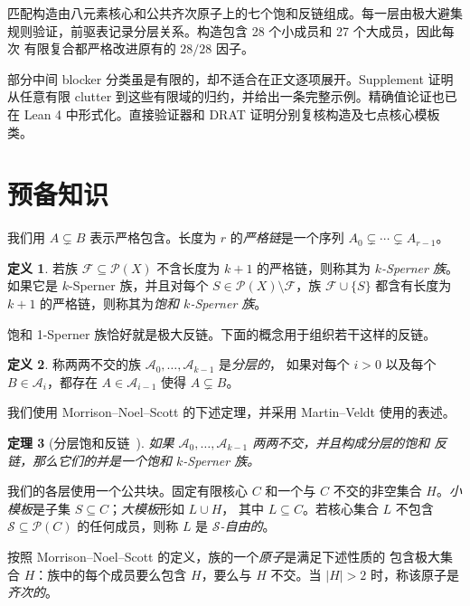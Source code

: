 \documentclass[UTF8,11pt,a4paper,fontset=fandol]{ctexart}
\newtheorem{theorem}{定理}[section]
\theoremstyle{definition}
\newtheorem{definition}[theorem]{定义}
\theoremstyle{remark}
\newcommand{\powerset}{\mathcal{P}}
\newcommand{\family}{\mathcal{F}}
\newcommand{\smallcores}{\mathcal{S}}
\begin{document}
匹配构造由八元素核心和公共齐次原子上的七个饱和反链组成。每一层由极大避集
规则验证，前驱表记录分层关系。构造包含 28 个小成员和 27 个大成员，因此每次
有限复合都严格改进原有的 $28/28$ 因子。

部分中间 blocker 分类虽是有限的，却不适合在正文逐项展开。Supplement 证明
从任意有限 clutter 到这些有限域的归约，并给出一条完整示例。精确值论证也已
在 Lean 4 中形式化。直接验证器和 DRAT 证明分别复核构造及七点核心模板类。

\section{预备知识}
\label{sec:preliminaries}

我们用 $A\subsetneq B$ 表示严格包含。长度为 $r$ 的\emph{严格链}是一个序列
$A_0\subsetneq\cdots\subsetneq A_{r-1}$。

\begin{definition}
若族 $\family\subseteq\powerset(X)$ 不含长度为 $k+1$ 的严格链，则称其为
\emph{$k$-Sperner 族}。如果它是 $k$-Sperner 族，并且对每个
$S\in\powerset(X)\setminus\family$，族 $\family\cup\{S\}$ 都含有长度为
$k+1$ 的严格链，则称其为\emph{饱和 $k$-Sperner 族}。
\end{definition}

饱和 1-Sperner 族恰好就是极大反链。下面的概念用于组织若干这样的反链。

\begin{definition}
称两两不交的族 $\mathcal A_0,\ldots,\mathcal A_{k-1}$ 是\emph{分层的}，
如果对每个 $i>0$ 以及每个 $B\in\mathcal A_i$，都存在
$A\in\mathcal A_{i-1}$ 使得 $A\subsetneq B$。
\end{definition}

我们使用 Morrison--Noel--Scott 的下述定理，并采用 Martin--Veldt 使用的表述。

\begin{theorem}[分层饱和反链~\cite{mns2014,martinveldt2025}]
\label{thm:layered}
如果 $\mathcal A_0,\ldots,\mathcal A_{k-1}$ 两两不交，并且构成分层的饱和
反链，那么它们的并是一个饱和 $k$-Sperner 族。
\end{theorem}

我们的各层使用一个公共块。固定有限核心 $C$ 和一个与 $C$ 不交的非空集合
$H$。\emph{小模板}是子集 $S\subseteq C$；\emph{大模板}形如 $L\cup H$，
其中 $L\subseteq C$。若核心集合 $L$ 不包含
$\smallcores\subseteq\powerset(C)$ 的任何成员，则称 $L$ 是
\emph{$\smallcores$-自由的}。

按照 Morrison--Noel--Scott 的定义，族的一个\emph{原子}是满足下述性质的
包含极大集合 $H$：族中的每个成员要么包含 $H$，要么与 $H$ 不交。当
$|H|>2$ 时，称该原子是\emph{齐次的}。
\end{document}
